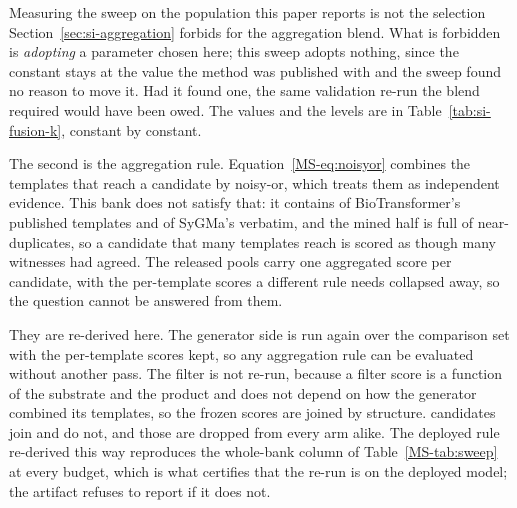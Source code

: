 \documentclass[journal=jcisd8,manuscript=suppinfo,layout=onecolumn]{achemso}
\begin{document}
Measuring the sweep on the population this paper reports is not the selection
Section~\ref{sec:si-aggregation} forbids for the aggregation blend. What is forbidden is
\emph{adopting} a parameter chosen here; this sweep adopts nothing, since the constant stays at
the value the method was published with and the sweep found no reason to move it. Had it found one,
the same validation re-run the blend required would have been owed. The values and the levels are
in Table~\ref{tab:si-fusion-k}, constant by constant.



The second is the aggregation rule. Equation~\ref{MS-eq:noisyor} combines the templates that
reach a candidate by noisy-or, which treats them as independent evidence. This bank does not
satisfy that: it contains \numThirdpartyBiotransformerShipped{} of BioTransformer's published
templates and \numSygmaInside{} of SyGMa's verbatim, and the mined half is full of
near-duplicates, so a candidate that many templates reach is scored as though many witnesses had
agreed. The released pools carry one aggregated score per candidate, with the per-template
scores a different rule needs collapsed away, so the question cannot be answered from them.

They are re-derived here. The generator side is run again over the comparison set with the
per-template scores kept, so any aggregation rule can be evaluated without
another pass. The filter is not re-run, because a filter score is a function of the substrate and
the product and does not depend on how the generator combined its templates, so the frozen scores
are joined by structure. \numAggregationJoined{} candidates join and
\numAggregationUnjoined{} do not, and those are dropped from every arm alike. The deployed
rule re-derived this way reproduces the whole-bank column of Table~\ref{MS-tab:sweep} at every
budget, which is what certifies that the re-run is on the deployed model; the artifact refuses to
report if it does not.


\end{document}
